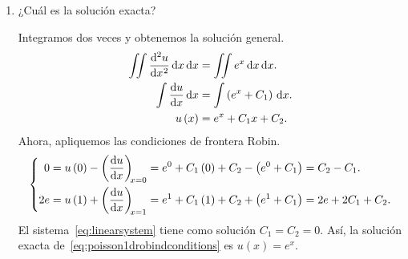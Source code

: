 \begin{problem}
\begin{enumerate}
    \item

          ¿Cuál es la solución exacta?

          \begin{solution}
              Integramos dos veces y obtenemos la solución general.
              \begin{align*}
                  \iint
                  \diff[2]{u}{x}
                  \dl x
                  \dl x           & =
                  \iint
                  e^{x}
                  \dl x
                  \dl x.              \\
                  \int
                  \diff{u}{x}
                  \dl x           & =
                  \int
                  \left(e^{x}+C_{1}\right)
                  \dl x.              \\
                  u\left(x\right) & =
                  e^{x}+C_{1}x+C_{2}.
              \end{align*}
              Ahora, apliquemos las condiciones de frontera Robin.
              \begin{equation}\label{eq:linearsystem}
                  \left\{
                  \begin{aligned}
                      0
                       & =
                      u\left(0\right)-
                      \diff{u}{x}[x=0]=
                      e^{0}+C_{1}\left(0\right)+C_{2}-
                      \left(e^{0}+C_{1}\right)=
                      C_{2}-C_{1}. \\
                      2e
                       & =
                      u\left(1\right)+
                      \diff{u}{x}[x=1]=
                      e^{1}+C_{1}\left(1\right)+C_{2}+
                      \left(e^{1}+C_{1}\right)=
                      2e+2C_{1}+C_{2}.
                  \end{aligned}
                  \right.
              \end{equation}
              El sistema~\eqref{eq:linearsystem} tiene como solución
              $C_{1}=C_{2}=0$.
              Así, la solución exacta
              de~\eqref{eq:poisson1drobindconditions} es
              $u\left(x\right)=e^{x}$.
              \noQED
          \end{solution}
\end{enumerate}


\end{problem}
